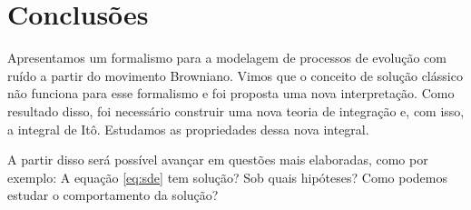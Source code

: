 \documentclass[12pt,a4paper]{article}
\theoremstyle{definition}
\newtheorem{definition}{Definição}
\begin{document}




\section*{Conclusões}

Apresentamos um formalismo para a modelagem de processos de evolução com ruído a partir do movimento Browniano. Vimos que o conceito de solução clássico não funciona para esse formalismo e foi proposta uma nova interpretação. Como resultado disso, foi necessário construir uma nova teoria de integração e, com isso, a integral de Itô. Estudamos as propriedades dessa nova integral. 

A partir disso será possível avançar em questões mais elaboradas, como por exemplo: A equação \eqref{eq:sde} tem solução? Sob quais hipóteses? Como podemos estudar o comportamento da solução?

\nocite{*}


\end{document}
